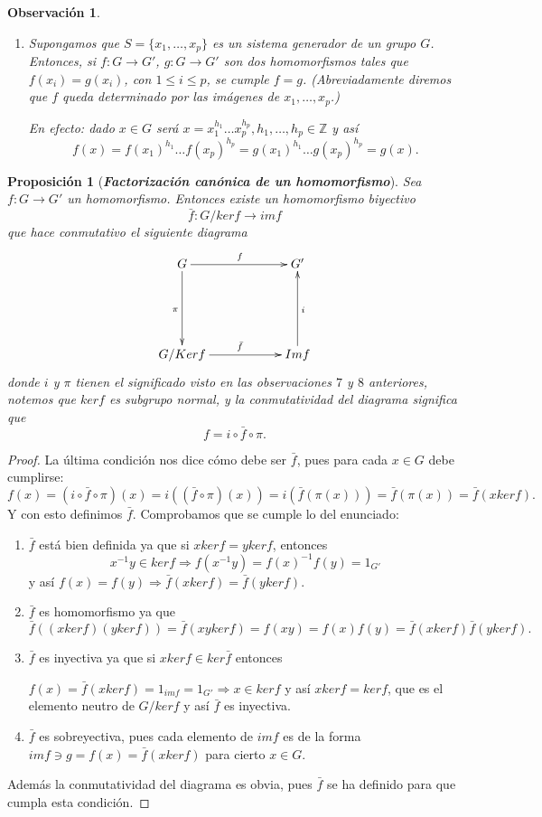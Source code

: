 \documentclass[12pt]{article}
\newtheorem{proposition}[theorem]{Proposición}
\newtheorem{observation}{Observación}[theorem]
\begin{document}
\begin{observation}
\begin{enumerate}
\item Supongamos que $S = \lbrace x_1, \ldots, x_p \rbrace$ es un sistema generador de un grupo $G$. Entonces, si $f \colon G \longrightarrow G'$, $g \colon G \longrightarrow G'$ son dos homomorfismos tales que $f(x_i) = g(x_i)$, con $1 \leq i \leq p$, se cumple $f=g$. (Abreviadamente diremos que $f$ queda determinado por las imágenes de $x_1, \ldots, x_p$.)

En efecto: dado $x\in G$ será $x = x_1^{h_1} \ldots x_p^{h_p}, h_1, \ldots, h_p \in \mathbb{Z}$ y así $$f(x) =  f(x_1)^{h_1} \ldots f(x_p)^{h_p} =  g(x_1)^{h_1} \ldots g(x_p)^{h_p} = g(x).$$
\end{enumerate}
\end{observation}

\begin{proposition}[\textbf{\textit{Factorización canónica de un homomorfismo}}]
Sea $f \colon G \longrightarrow G'$ un homomorfismo. Entonces existe un homomorfismo biyectivo $$\bar{f} \colon G/ker f \longrightarrow im f$$ que hace conmutativo el siguiente diagrama $$\xymatrix @=2cm {G\ar[r]^{f} \ar[d]_\pi & G'  \\ G/Ker f \ar[r]^{\bar{f}} & Im f \ar[u]_{i}}$$ donde $i$ y $\pi$ tienen el significado visto en las observaciones $7$ y $8$ anteriores, notemos que $ker f$ es subgrupo normal, y la conmutatividad del diagrama significa que $$f = i \circ \bar{f} \circ \pi.$$
\end{proposition}
\begin{proof}
La última condición nos dice cómo debe ser $\bar{f}$, pues para cada $x \in G$ debe cumplirse:
$$f(x) = (i \circ \bar{f} \circ \pi) (x) =i((\bar{f} \circ \pi)(x)) =i(\bar{f}(\pi(x))) = \bar{f}(\pi(x)) = \bar{f}(x ker f).$$ Y con esto definimos $\bar{f}$. Comprobamos que se cumple lo del enunciado: 
\begin{enumerate}
\item $\bar{f}$ está bien definida ya que si $xker f = yker f$, entonces $$x^{-1}y \in ker f \Longrightarrow f(x^{-1}y) = f(x)^{-1}f(y)=1_{G'}$$ y así $f(x) = f(y) \Longrightarrow \bar{f}(xker f) = \bar{f}(yker f)$.
\item $\bar{f}$ es homomorfismo ya que $$\bar{f}((xkerf)(ykerf)) = \bar{f}(xykerf) = f(xy) = f(x)f(y) = \bar{f}(xkerf)\bar{f}(ykerf).$$
\item $\bar{f}$ es inyectiva ya que si $xkerf \in ker\bar{f}$ entonces 

$f(x) = \bar{f}(xkerf) = 1_{im f} = 1_{G'} \Longrightarrow x \in kerf$ y así $xkerf = kerf$, que es el elemento neutro de $G/ker f$ y así $\bar{f}$ es inyectiva.
\item $\bar{f}$ es sobreyectiva, pues cada elemento de $im f$ es de la forma $im f\ni g = f(x) = \bar{f}(xkerf)$ para cierto $x \in G.$

\end{enumerate}

Además la conmutatividad del diagrama es obvia, pues $\bar{f}$ se ha definido para que cumpla esta condición.

\end{proof}
\end{document}

